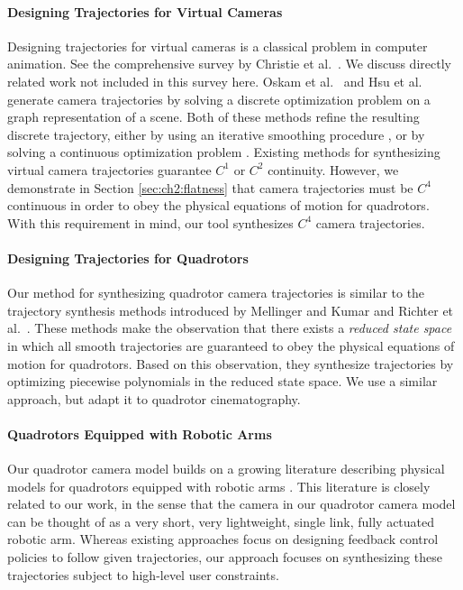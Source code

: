 \paragraph{Designing Trajectories for Virtual Cameras}
Designing trajectories for virtual cameras is a classical problem in computer animation.
See the comprehensive survey by Christie et al.~.
We discuss directly related work not included in this survey here.
Oskam et al.~ and Hsu et al.~ generate camera trajectories by solving a discrete optimization problem on a graph representation of a scene.
Both of these methods refine the resulting  discrete trajectory, either by using an iterative smoothing procedure \cite{oskam:2009}, or by solving a continuous optimization problem \cite{hsu:2013}.
Existing methods for synthesizing virtual camera trajectories guarantee $C^1$ or $C^2$ continuity.
However, we demonstrate in Section \ref{sec:ch2:flatness} that camera trajectories must be $C^4$ continuous in order to obey the physical equations of motion for quadrotors.
With this requirement in mind, our tool synthesizes $C^4$ camera trajectories.

\paragraph{Designing Trajectories for Quadrotors}
Our method for synthesizing quadrotor camera trajectories is similar to the trajectory synthesis methods introduced by Mellinger and Kumar  and Richter et al.~.
These methods make the observation that there exists a \emph{reduced state space} in which all smooth trajectories are guaranteed to obey the physical equations of motion for quadrotors.
Based on this observation, they synthesize trajectories by optimizing piecewise polynomials in the reduced state space.
We use a similar approach, but adapt it to quadrotor cinematography.

\paragraph{Quadrotors Equipped with Robotic Arms}
Our quadrotor camera model builds on a growing literature describing physical models for quadrotors equipped with robotic arms \cite{lipiello:2012,kim:2013,yang:2014,ruggiero:2015}.
This literature is closely related to our work, in the sense that the camera in our quadrotor camera model can be thought of as a very short, very lightweight, single link, fully actuated robotic arm.
Whereas existing approaches focus on designing feedback control policies to follow given trajectories, our approach focuses on synthesizing these trajectories subject to high-level user constraints.

